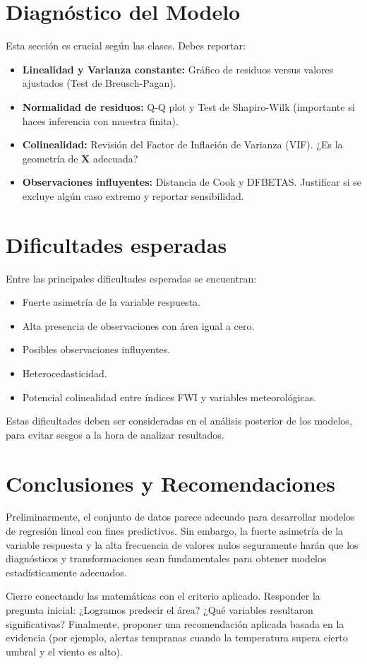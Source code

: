 \section{Diagnóstico del Modelo}
Esta sección es crucial según las clases. Debes reportar:
\begin{itemize}
    \item \textbf{Linealidad y Varianza constante:} Gráfico de residuos versus valores ajustados (Test de Breusch-Pagan).
    \item \textbf{Normalidad de residuos:} Q-Q plot y Test de Shapiro-Wilk (importante si haces inferencia con muestra finita).
    \item \textbf{Colinealidad:} Revisión del Factor de Inflación de Varianza (VIF). ¿Es la geometría de $\bm{X}$ adecuada?
    \item \textbf{Observaciones influyentes:} Distancia de Cook y DFBETAS. Justificar si se excluye algún caso extremo y reportar sensibilidad.
\end{itemize}

\section{Dificultades esperadas}
Entre las principales dificultades esperadas se encuentran:

\begin{itemize}
    \item Fuerte asimetría de la variable respuesta.
    \item Alta presencia de observaciones con área igual a cero.
    \item Posibles observaciones influyentes.
    \item Heterocedasticidad.
    \item Potencial colinealidad entre índices FWI y variables meteorológicas.
\end{itemize}
Estas dificultades deben ser consideradas en el análisis posterior de los modelos, para evitar sesgos a la hora de analizar resultados. 

\section{Conclusiones y Recomendaciones}
Preliminarmente, el conjunto de datos parece adecuado para desarrollar modelos de regresión lineal con fines predictivos. Sin embargo, la fuerte asimetría de la variable respuesta y la alta frecuencia de valores nulos seguramente harán que los diagnósticos y transformaciones sean fundamentales para obtener modelos estadísticamente adecuados.

Cierre conectando las matemáticas con el criterio aplicado. Responder la pregunta inicial: ¿Logramos predecir el área? ¿Qué variables resultaron significativas? Finalmente, proponer una recomendación aplicada basada en la evidencia (por ejemplo, alertas tempranas cuando la temperatura supera cierto umbral y el viento es alto).


